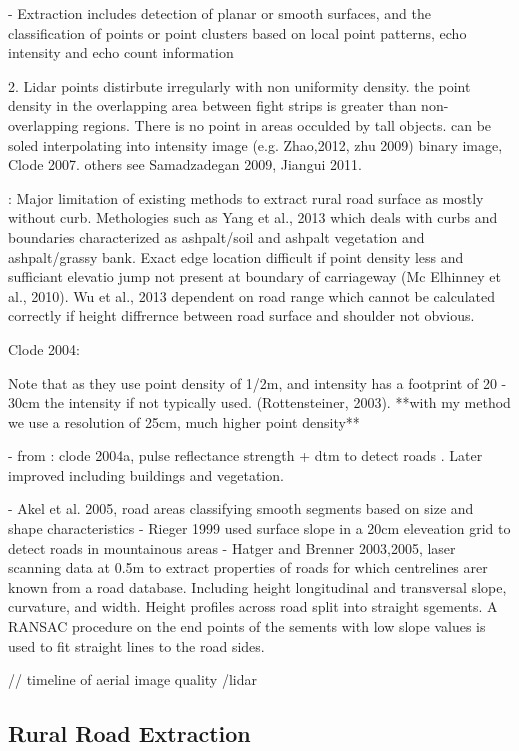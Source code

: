 \begin{multicols}{2}
- Extraction includes detection of planar or smooth surfaces, and the classification of points or point clusters based on local point patterns, echo intensity and echo count information \citep{vosselman2004;darmawati2008}

2. Lidar points distirbute irregularly with non uniformity density. the point density in the overlapping area between fight strips is greater than non-overlapping regions. There is no point in areas occulded by tall objects. can be soled interpolating into intensity image (e.g. Zhao,2012, zhu 2009) binary image, Clode 2007. others see Samadzadegan 2009, Jiangui 2011.

\citep{yadav2018}: Major limitation of existing methods to extract rural road surface as mostly without curb. Methologies such as Yang et al., 2013 which deals with curbs and boundaries characterized as ashpalt/soil and ashpalt vegetation and ashpalt/grassy bank. Exact edge location difficult if point density less and sufficiant elevatio jump not present at boundary of carriageway (Mc Elhinney et al., 2010). Wu et al., 2013 dependent on road range which cannot be calculated correctly if height diffrernce between road surface and shoulder not obvious.

Clode 2004:

Note that as they use point density of 1/2m, and intensity has a footprint of 20 - 30cm the intensity if not typically used. (Rottensteiner, 2003). **with my method we use a resolution of 25cm, much higher point density**



- from \citep{vosselman2009a}: clode 2004a, pulse reflectance strength + dtm to detect roads . Later improved including buildings and vegetation.

- Akel et al. 2005, road areas classifying smooth segments based on size and shape characteristics
- Rieger 1999 used surface slope in a 20cm eleveation grid to detect roads in mountainous areas
- Hatger and Brenner 2003,2005, laser scanning data at 0.5m to extract properties of roads for which centrelines arer known from a road database. Including height longitudinal and transversal slope, curvature, and width. Height profiles across road split into straight sgements. A RANSAC procedure on the end points of the sements with low slope values is used to fit straight lines to the road sides. \citep{hatger2003;hatger2005}

// timeline of aerial image quality /lidar

\subsection{Rural Road Extraction}


\end{multicols}
